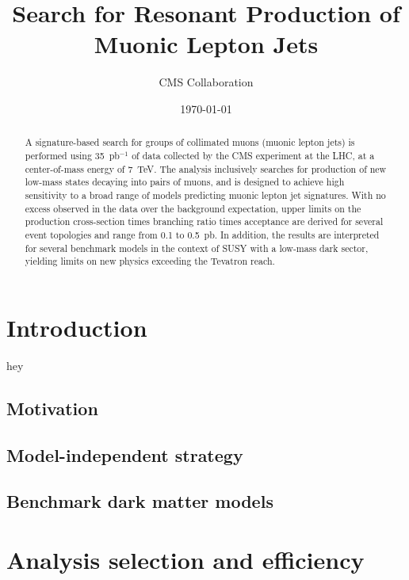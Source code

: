\documentclass[prd,twocolumn]{revtex4}
\begin{document}
\title{Search for Resonant Production of Muonic Lepton Jets}
\author{CMS Collaboration}
\noaffiliation

\date{\today}

\begin{abstract}
A signature-based search for groups of collimated muons (muonic lepton
jets) is performed using 35~pb$^{-1}$ of data collected by the CMS
experiment at the LHC, at a center-of-mass energy of 7~TeV.  The
analysis inclusively searches for production of new low-mass states
decaying into pairs of muons, and is designed to achieve high
sensitivity to a broad range of models predicting muonic lepton jet
signatures.  With no excess observed in the data over the background
expectation, upper limits on the production cross-section times
branching ratio times acceptance are derived for several event
topologies and range from 0.1 to 0.5~pb.  In addition, the results are
interpreted for several benchmark models in the context of SUSY with a
low-mass dark sector, yielding limits on new physics exceeding the
Tevatron reach.
\end{abstract}

\maketitle

\section{Introduction}

hey \citep{Pamela-positron}

\subsection{Motivation}

\subsection{Model-independent strategy}

\subsection{Benchmark dark matter models}

\section{Analysis selection and efficiency}
\end{document}
